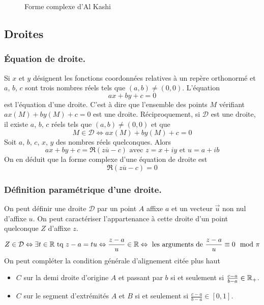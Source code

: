 \begin{figure}
 \centering
 
 \caption{Forme complexe d'Al Kashi}
 \label{fig:C2002_1}
\end{figure}

\subsection{Droites}
\subsubsection{\'Equation de droite.}
Si $x$ et $y$ désignent les fonctions coordonnées relatives à un repère orthonormé et $a$, $b$, $c$ sont trois nombres réels tels que $(a,b)\neq(0,0)$. L'équation
\begin{displaymath}
 ax+by+c =0
\end{displaymath}
est l'équation d'une droite. C'est à dire que l'ensemble des points $M$ vérifiant $ax(M)+by(M)+c=0$ est une droite.\newline
Réciproquement, si $\mathcal{D}$ est une droite, il existe $a$, $b$, $c$ réels tels que $(a,b)\neq(0,0)$ et que 
\begin{displaymath}
M\in \mathcal{D} \Leftrightarrow ax(M) + by(M) + c =0
\end{displaymath}
Soit $a$, $b$, $c$, $x$, $y$ des nombres réels quelconques. Alors
\begin{displaymath}
 ax+by+c = \Re(z\overline{u}-c) \text{ avec } z = x+iy \text{ et } u = a+ib 
\end{displaymath}
On en déduit que la forme complexe d'une équation de droite est
\begin{displaymath}
 \Re(z\overline{u}-c) = 0
\end{displaymath}
\subsubsection{Définition paramétrique d'une droite.}
On peut définir une droite $\mathcal{D}$ par un point $A$ affixe $a$ et un vecteur $\overrightarrow{u}$ non nul d'affixe $u$. On peut caractériser l'appartenance à cette droite d'un point quelconque $Z$ d'affixe $z$.
\begin{displaymath}
 Z\in \mathcal{D} \Leftrightarrow \exists t\in \mathbb{R} \text{ tq } z-a = tu
\Leftrightarrow \frac{z-a}{u} \in \mathbb{R}
\Leftrightarrow \text{ les arguments de } \frac{z-a}{u} \equiv 0 \mod \pi
\end{displaymath}
On peut compléter la condition générale d'alignement citée plus haut
\begin{itemize}
 \item $C$ sur la demi droite d'origine $A$ et passant par $b$ si et seulement si $\frac{c-a}{b-a}\in \mathbb{R}_+$.
 \item $C$ sur le segment d'extrémités $A$ et $B$ si et seulement si $\frac{c-a}{b-a}\in [0,1]$.
\end{itemize}

